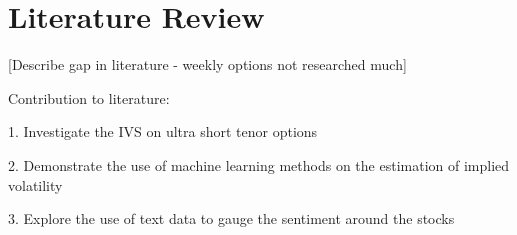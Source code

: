 \section{Literature Review} \label{literature_review}

[Describe gap in literature - weekly options not researched much]

Contribution to literature:

1. Investigate the IVS on ultra short tenor options

2. Demonstrate the use of machine learning methods on the estimation of implied volatility

3. Explore the use of text data to gauge the sentiment around the stocks 